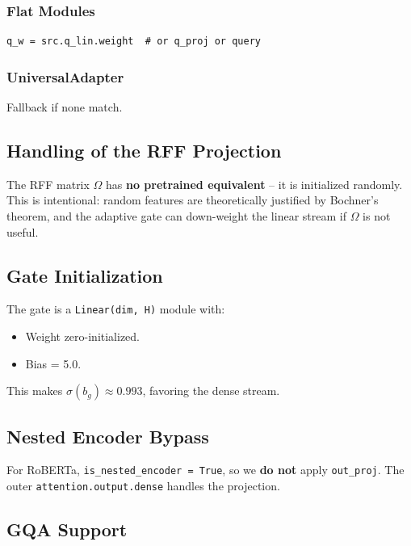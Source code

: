 \subsubsection{Flat Modules}

\begin{lstlisting}
q_w = src.q_lin.weight  # or q_proj or query
\end{lstlisting}

\subsubsection{UniversalAdapter}

Fallback if none match.

\subsection{Handling of the RFF Projection}

The RFF matrix $\Omega$ has \textbf{no pretrained equivalent} -- it is initialized 
randomly. This is intentional: random features are theoretically justified 
by Bochner's theorem, and the adaptive gate can down-weight the linear 
stream if $\Omega$ is not useful.

\subsection{Gate Initialization}

The gate is a \texttt{Linear(dim, H)} module with:

\begin{itemize}
\item Weight zero-initialized.
\item Bias = 5.0.

\end{itemize}
This makes $\sigma(b_g) \approx 0.993$, favoring the dense stream.

\subsection{Nested Encoder Bypass}

For RoBERTa, \texttt{is\_nested\_encoder = True}, so we \textbf{do not} apply \texttt{out\_proj}. 
The outer \texttt{attention.output.dense} handles the projection.

\subsection{GQA Support}

